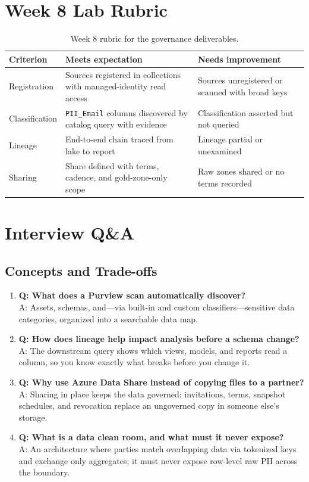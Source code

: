 \section{Week 8 Lab Rubric}
\begin{table}[H]
\centering
\small
\begin{tabular}{@{}p{3.2cm}p{5.0cm}p{5.0cm}@{}}
\toprule
\textbf{Criterion} & \textbf{Meets expectation} & \textbf{Needs improvement} \\
\midrule
Registration & Sources registered in collections with managed-identity read access & Sources unregistered or scanned with broad keys \\
Classification & \texttt{PII\_Email} columns discovered by catalog query with evidence & Classification asserted but not queried \\
Lineage & End-to-end chain traced from lake to report & Lineage partial or unexamined \\
Sharing & Share defined with terms, cadence, and gold-zone-only scope & Raw zones shared or no terms recorded \\
\bottomrule
\end{tabular}
\caption{Week 8 rubric for the governance deliverables.}
\label{tab:ch8-rubric}
\end{table}

\section{Interview Q\&A}
\subsection{Concepts and Trade-offs}
\begin{enumerate}
    \item \textbf{Q: What does a Purview scan automatically discover?}\\
    A: Assets, schemas, and---via built-in and custom classifiers---sensitive data categories, organized into a searchable data map.
    \item \textbf{Q: How does lineage help impact analysis before a schema change?}\\
    A: The downstream query shows which views, models, and reports read a column, so you know exactly what breaks before you change it.
    \item \textbf{Q: Why use Azure Data Share instead of copying files to a partner?}\\
    A: Sharing in place keeps the data governed: invitations, terms, snapshot schedules, and revocation replace an ungoverned copy in someone else's storage.
    \item \textbf{Q: What is a data clean room, and what must it never expose?}\\
    A: An architecture where parties match overlapping data via tokenized keys and exchange only aggregates; it must never expose row-level raw PII across the boundary.
\end{enumerate}

